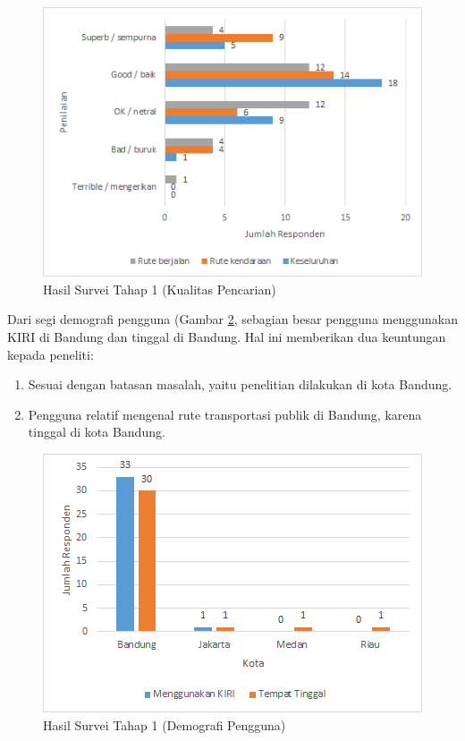 \begin{figure}
	\centering
	\includegraphics[scale=0.75]{Gambar/5_hasilsurvei_1_1}
	\caption{Hasil Survei Tahap 1 (Kualitas Pencarian)} 
	\label{fig:5_hasilsurvei_1_1}
\end{figure}

Dari segi demografi pengguna (Gambar \ref{fig:5_hasilsurvei_1_2}, sebagian besar pengguna menggunakan KIRI di Bandung dan tinggal di Bandung. Hal ini memberikan dua keuntungan kepada peneliti:

\begin{enumerate}
	\item Sesuai dengan batasan masalah, yaitu penelitian dilakukan di kota Bandung.
	\item Pengguna relatif mengenal rute transportasi publik di Bandung, karena tinggal di kota Bandung.
\end{enumerate}

\begin{figure}
	\centering
	\includegraphics[scale=0.75]{Gambar/5_hasilsurvei_1_2}
	\caption{Hasil Survei Tahap 1 (Demografi Pengguna)} 
	\label{fig:5_hasilsurvei_1_2}
\end{figure}

